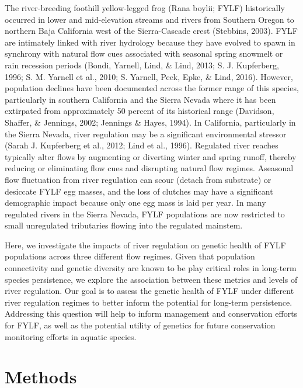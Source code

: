 \documentclass[twoside,12pt,final]{ucthesis-CA2012}
\begin{document}
\begin{ucmainmatter}
The river-breeding foothill yellow-legged frog (Rana boylii; FYLF)
historically occurred in lower and mid-elevation streams and rivers from
Southern Oregon to northern Baja California west of the Sierra-Cascade
crest (Stebbins, 2003). FYLF are intimately linked with river hydrology
because they have evolved to spawn in synchrony with natural flow cues
associated with seasonal spring snowmelt or rain recession periods
(Bondi, Yarnell, Lind, \& Lind, 2013; S. J. Kupferberg, 1996; S. M.
Yarnell et al., 2010; S. Yarnell, Peek, Epke, \& Lind, 2016). However,
population declines have been documented across the former range of this
species, particularly in southern California and the Sierra Nevada where
it has been extirpated from approximately 50 percent of its historical
range (Davidson, Shaffer, \& Jennings, 2002; Jennings \& Hayes, 1994).
In California, particularly in the Sierra Nevada, river regulation may
be a significant environmental stressor (Sarah J. Kupferberg et al.,
2012; Lind et al., 1996). Regulated river reaches typically alter flows
by augmenting or diverting winter and spring runoff, thereby reducing or
eliminating flow cues and disrupting natural flow regimes. Aseasonal
flow fluctuation from river regulation can scour (detach from substrate)
or desiccate FYLF egg masses, and the loss of clutches may have a
significant demographic impact because only one egg mass is laid per
year. In many regulated rivers in the Sierra Nevada, FYLF populations
are now restricted to small unregulated tributaries flowing into the
regulated mainstem.

Here, we investigate the impacts of river regulation on genetic health
of FYLF populations across three different flow regimes. Given that
population connectivity and genetic diversity are known to be play
critical roles in long-term species persistence, we explore the
association between these metrics and levels of river regulation. Our
goal is to assess the genetic health of FYLF under different river
regulation regimes to better inform the potential for long-term
persistence. Addressing this question will help to inform management and
conservation efforts for FYLF, as well as the potential utility of
genetics for future conservation monitoring efforts in aquatic species.

\hypertarget{methods}{%
\section{Methods}\label{methods}}

\hypertarget{sample-collection}{%
}
\end{ucmainmatter}
\end{document}
